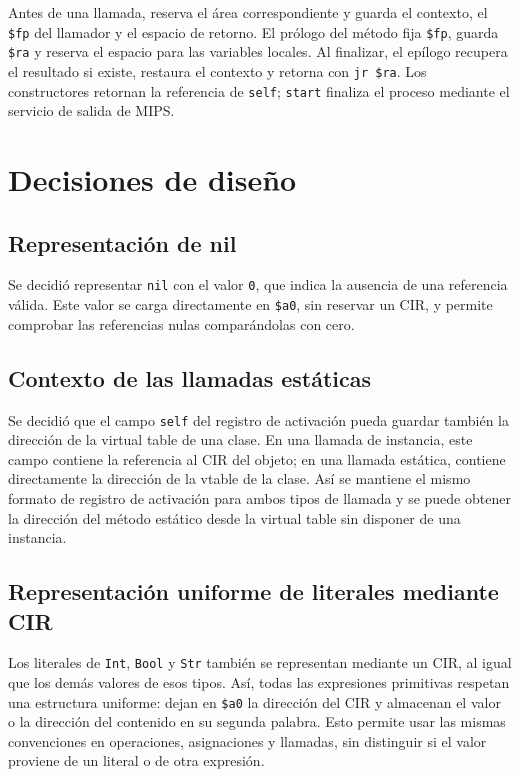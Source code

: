 Antes de una llamada,  reserva el área
correspondiente y guarda el contexto, el \texttt{\$fp} del llamador y el
espacio de retorno. El prólogo del método fija \texttt{\$fp}, guarda
\texttt{\$ra} y reserva el espacio para las variables locales. Al
finalizar, el epílogo recupera el resultado si existe, restaura el
contexto y retorna con \texttt{jr \$ra}. Los constructores retornan la
referencia de \texttt{self}; \texttt{start} finaliza el proceso mediante
el servicio de salida de MIPS.

\section{Decisiones de diseño}
\label{sec:decisiones-diseno}

\subsection{Representación de nil}
Se decidió representar \texttt{nil} con el valor \texttt{0}, que indica
la ausencia de una referencia válida. Este valor se carga directamente
en \texttt{\$a0}, sin reservar un CIR, y permite comprobar las
referencias nulas comparándolas con cero.

\subsection{Contexto de las llamadas estáticas}
Se decidió que el campo \texttt{self} del registro de activación pueda
guardar también la dirección de la virtual table de una clase.
En una llamada de instancia, este campo contiene la referencia al CIR
del objeto; en una llamada estática, contiene directamente la dirección
de la vtable de la clase. Así se mantiene el mismo formato de registro
de activación para ambos tipos de llamada y se puede obtener la dirección
del método estático desde la virtual table sin disponer de una instancia.

\subsection{Representación uniforme de literales mediante CIR}
Los literales de \texttt{Int}, \texttt{Bool} y \texttt{Str} también se
representan mediante un CIR, al igual que los demás valores de esos
tipos. Así, todas las expresiones primitivas respetan una estructura
uniforme: dejan en \texttt{\$a0} la dirección del CIR y almacenan el
valor o la dirección del contenido en su segunda palabra. Esto permite
usar las mismas convenciones en operaciones, asignaciones y llamadas,
sin distinguir si el valor proviene de un literal o de otra expresión.

